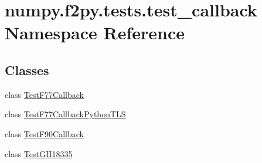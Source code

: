 \hypertarget{namespacenumpy_1_1f2py_1_1tests_1_1test__callback}{}\section{numpy.\+f2py.\+tests.\+test\+\_\+callback Namespace Reference}
\label{namespacenumpy_1_1f2py_1_1tests_1_1test__callback}
\subsection*{Classes}
\begin{DoxyCompactItemize}
\item 
class \hyperlink{classnumpy_1_1f2py_1_1tests_1_1test__callback_1_1TestF77Callback}{Test\+F77\+Callback}
\item 
class \hyperlink{classnumpy_1_1f2py_1_1tests_1_1test__callback_1_1TestF77CallbackPythonTLS}{Test\+F77\+Callback\+Python\+T\+LS}
\item 
class \hyperlink{classnumpy_1_1f2py_1_1tests_1_1test__callback_1_1TestF90Callback}{Test\+F90\+Callback}
\item 
class \hyperlink{classnumpy_1_1f2py_1_1tests_1_1test__callback_1_1TestGH18335}{Test\+G\+H18335}
\end{DoxyCompactItemize}
